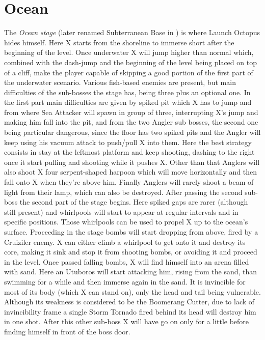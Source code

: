 \section{Ocean}
The \textit{Ocean stage} (later renamed Subterranean Base in \mhx) is where Launch Octopus hides himself. Here X starts from the shoreline to immerse short after the beginning of the level. Once underwater X will jump higher than normal which, combined with the dash-jump and the beginning of the level being placed on top of a cliff, make the player capable of skipping a good portion of the first part of the underwater scenario\cite{stratwiki:Ocean}. Various fish-based enemies are present, but main difficulties of the sub-bosses the stage has, being three plus an optional one. In the first part main difficulties are given by spiked pit which X has to jump and from where Sea Attacker will spawn in group of three, interrupting X's jump and making him fall into the pit, and from the two Angler sub bosses, the second one being particular dangerous, since the floor has two spiked pits and the Angler will keep using his vacuum attack to push/pull X into them. Here the best strategy consists in stay at the leftmost platform and keep shooting, dashing to the right once it start pulling and shooting while it pushes X. Other than that Anglers will also shoot X four serpent-shaped harpoon which will move horizontally and then fall onto X when they're above him. Finally Anglers will rarely shoot a beam of light from their lamp, which can also be destroyed. After passing the second sub-boss the second part of the stage begins. Here spiked gaps are rarer (although still present) and whirlpools will start to appear at regular intervals and in specific positions. Those whirlpools can be used to propel X up to the ocean's surface. Proceeding in the stage bombs will start dropping from above, fired by a Cruiziler enemy. X can either climb a whirlpool to get onto it and destroy its core, making it sink and stop it from shooting bombs, or avoiding it and proceed in the level. Once passed falling bombs, X will find himself into an arena filled with sand. Here an Utuboros will start attacking him, rising from the sand, than swimming for a while and then immerse again in the sand. It is invincible for most of its body (which X can stand on), only the head and tail being vulnerable. Although its weakness is considered to be the Boomerang Cutter, due to lack of invincibility frame a single Storm Tornado fired behind its head will destroy him in one shot\cite{wiki:Utuboros}. After this other sub-boss X will have go on only for a little before finding himself in front of the boss door.
